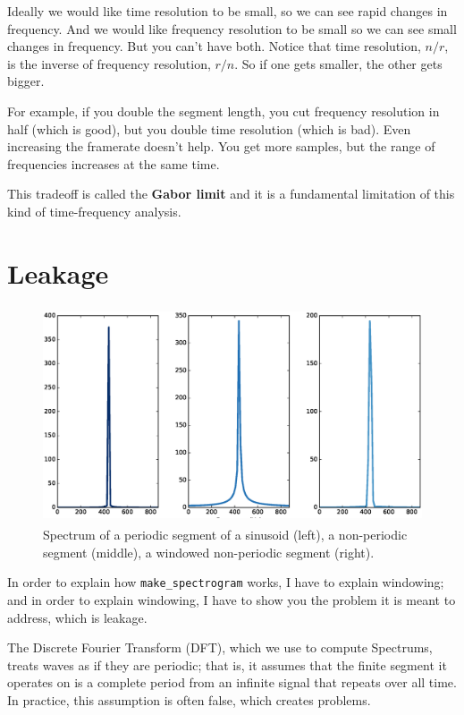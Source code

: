 \documentclass[12pt]{book}
\begin{document}
Ideally we would like time resolution to be small, so we can see rapid
changes in frequency.  And we would like frequency resolution to be
small so we can see small changes in frequency.  But you can't have
both.  Notice that time resolution, $n/r$, is the inverse of frequency
resolution, $r/n$.  So if one gets smaller, the other gets bigger.

For example, if you double the segment length, you cut frequency
resolution in half (which is good), but you double time resolution
(which is bad).  Even increasing the framerate doesn't help.  You get
more samples, but the range of frequencies increases at
the same time.

This tradeoff is called the {\bf Gabor limit} and it is a fundamental
limitation of this kind of time-frequency analysis.


\section{Leakage}

\begin{figure}
\centerline{\includegraphics[height=2.5in]{figs/windowing1.eps}}
\caption{Spectrum of a periodic segment of a sinusoid (left), a
  non-periodic segment (middle), a windowed non-periodic segment
  (right).}
\label{fig.windowing1}
\end{figure}

In order to explain how \verb"make_spectrogram" works, I have
to explain windowing; and in order to explain windowing, I have to
show you the problem it is meant to address, which is leakage.

The Discrete Fourier Transform (DFT), which we use to compute
Spectrums, treats waves as if they are periodic; that is, it assumes
that the finite segment it operates on is a complete period from an
infinite signal that repeats over all time.  In practice, this
assumption is often false, which creates problems.
\end{document}

